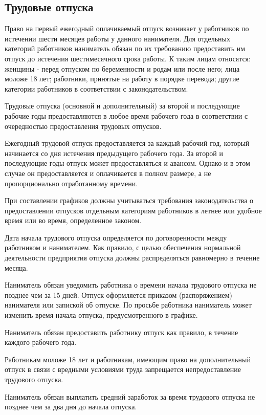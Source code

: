 \documentclass[14pt,a4paper]{extarticle}
\begin{document}
\subsection{Трудовые отпуска}
Право на первый ежегодный оплачиваемый отпуск возникает у работников по истечении шести месяцев работы у данного нанимателя. Для отдельных категорий работников наниматель обязан по их требованию предоставить им отпуск до истечения шестимесячного срока работы. К таким лицам относятся: женщины - перед отпуском по беременности и родам или после него; лица моложе 18 лет; работники, принятые на работу в порядке перевода; другие категории работников в соответствии с законодательством.

Трудовые отпуска (основной и дополнительный) за второй и последующие рабочие годы предоставляются в любое время рабочего года в соответствии с очередностью предоставления трудовых отпусков.

Ежегодный трудовой отпуск предоставляется за каждый рабочий год, который начинается со дня истечения предыдущего рабочего года. За второй и последующие годы отпуск может предоставляться и авансом. Однако и в этом случае он предоставляется и оплачивается в полном размере, а не пропорционально отработанному времени.

При составлении графиков должны учитываться требования законодательства о предоставлении отпусков отдельным категориям работников в летнее или удобное время или во время, определенное законом.

Дата начала трудового отпуска определяется по договоренности между работником и нанимателем. Как правило, с целью обеспечения нормальной деятельности предприятия отпуска должны распределяться равномерно в течение месяца.

Наниматель обязан уведомить работника о времени начала трудового отпуска не позднее чем за 15 дней. Отпуск оформляется приказом (распоряжением) нанимателя или запиской об отпуске. По просьбе работника наниматель может изменить время начала отпуска, предусмотренного в графике.

Наниматель обязан предоставить работнику отпуск как правило, в течение каждого рабочего года.

Работникам моложе 18 лет и работникам, имеющим право на дополнительный отпуск в связи с вредными условиями труда запрещается непредоставление трудового отпуска.

Наниматель обязан выплатить средний заработок за время трудового отпуска не позднее чем за два дня до начала отпуска.
\end{document}
